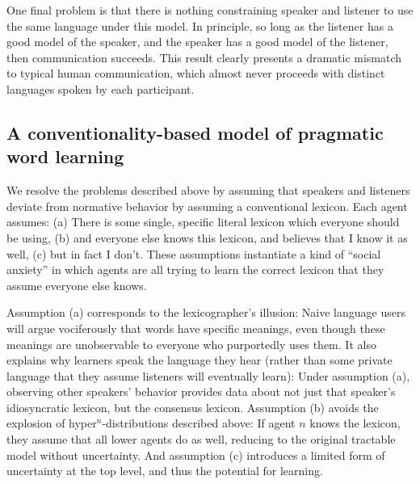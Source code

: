 \documentclass{article} %
\begin{document}
One final problem is that there is nothing
constraining speaker and listener to use the same language under this
model. In principle, so long as the listener has a good model of the
speaker, and the speaker has a good model of the listener, then
communication succeeds. This result clearly presents a dramatic
mismatch to typical human communication, which almost never proceeds
with distinct languages spoken by each participant.


\subsection{A conventionality-based model of pragmatic word learning}

We resolve the problems described above by assuming that speakers and
listeners deviate from normative behavior by assuming a conventional
lexicon.
Each agent assumes: (a) There is some single, specific literal lexicon
which everyone should be using, (b) and everyone else knows this
lexicon, and believes that I know it as well, (c) but in fact I
don't. These assumptions instantiate a kind of ``social anxiety'' in
which agents are all trying to learn the correct lexicon that they
assume everyone else knows.

Assumption (a) corresponds to the lexicographer's illusion: Naive
language users will argue vociferously that words have specific
meanings, even though these meanings are unobservable to everyone who
purportedly uses them. It also explains why learners speak the
language they hear (rather than some private language that they assume
listeners will eventually learn): Under assumption (a), observing
other speakers' behavior provides data about not just that speaker's
idiosyncratic lexicon, but the consensus lexicon. Assumption (b)
avoids the explosion of hyper$^n$-distributions described above: If
agent $n$ knows the lexicon, they assume that all lower agents do as
well, reducing to the original tractable model without
uncertainty. And assumption (c) introduces a limited form of
uncertainty at the top level, and thus the potential for learning.
\end{document}
